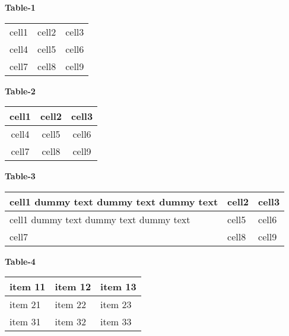 \documentclass{article}
\begin{document}
\begin{center}
    \Large \textbf{Table-1}
\end{center}

\begin{center}
\begin{tabular}{ c c c }
    cell1 & cell2 & cell3 \\
    cell4 & cell5 & cell6 \\
    cell7 & cell8 & cell9 
\end{tabular}
\end{center}


\begin{center}
    \Large \textbf{Table-2}
\end{center}

\begin{center}
\begin{tabular}{ |c| c |c| }
    \hline
    cell1 & cell2 & cell3 \\
    \hline
    cell4 & cell5 & cell6 \\
    \hline
    cell7 & cell8 & cell9 \\
    \hline
\end{tabular}
\end{center}

\begin{center}
    \Large \textbf{Table-3}
\end{center}

\begin{center}
\begin{tabular}{ | m{5em} | m{1cm}| m{1cm} | }
\hline
cell1 dummy text dummy text dummy text & cell2 & cell3 \\
\hline
cell1 dummy text dummy text dummy text & cell5 & cell6 \\
\hline
cell7 & cell8 & cell9 \\
\hline
\end{tabular}
\end{center}

\begin{center}
    \Large \textbf{Table-4}
\end{center}


\begin{center}
\begin{tabu} to 0.6\textwidth { | X[l] | X[c] | X[r] | } 

\hline
item 11 & item 12 & item 13 \\

\hline
item 21 & item 22 & item 23 \\

\hline
item 31 & item 32 & item 33 \\
\hline

\end{tabu}
\end{center}
\end{document}
